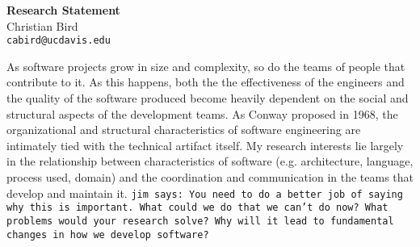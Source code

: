 \documentclass[10pt]{article}
\begin{document}
\thispagestyle{fancy}
\lhead{}
\rhead{}
\renewcommand{\headrulewidth}{0pt} 
\renewcommand{\footrulewidth}{0pt} 


\pagestyle{fancy}

\begin{small}

\begin{center}
{\LARGE \bf Research Statement}\\
\vspace*{0.2cm}
{\large Christian Bird}\\
\vspace*{0cm}
\texttt{\normalsize cabird@ucdavis.edu}
\end{center}



As software projects grow in size and complexity, so do the teams of
people that contribute to it.  As this happens, both
the the effectiveness of the engineers and the quality of the software produced 
become heavily dependent on the social and structural aspects of the development
teams.  As Conway proposed in 1968, the organizational and
structural characteristics of software engineering are intimately tied with the
technical artifact itself.  My research interests lie largely in the
relationship between characteristics of software (e.g.  architecture, language,
process used, domain) and the coordination and communication in the teams that
develop and maintain it.  \texttt{jim says: You need to do a better job of saying
why this is important. What could we do that we can't do now?  What problems
would your research solve?  Why will it lead to fundamental changes in how we
develop software?}


\end{small}
\end{document}
